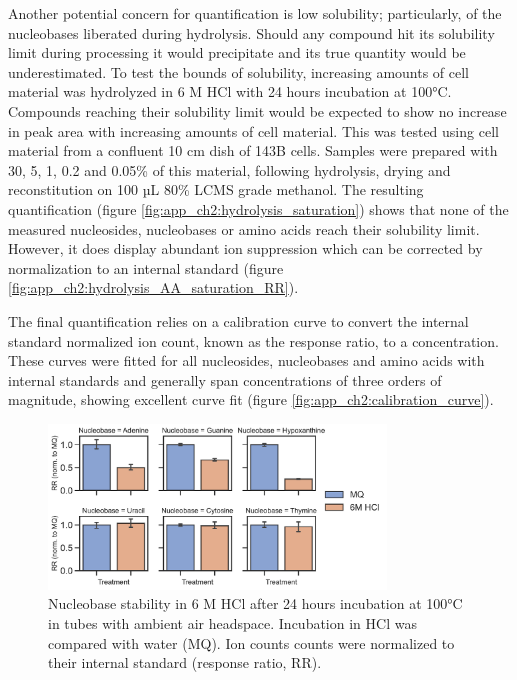 Another potential concern for quantification is low solubility; particularly, of the nucleobases liberated during hydrolysis.
Should any compound hit its solubility limit during processing it would precipitate and its true quantity would be underestimated.
To test the bounds of solubility, increasing amounts of cell material was hydrolyzed in 6 M HCl with 24 hours incubation at 100°C.
Compounds reaching their solubility limit would be expected to show no increase in peak area with increasing amounts of cell material.
This was tested using cell material from a confluent 10 cm dish of 143B cells.
Samples were prepared with 30, 5, 1, 0.2 and 0.05\% of this material, following hydrolysis, drying and reconstitution on 100 µL 80\% LCMS grade methanol.
The resulting quantification (figure \ref{fig:app_ch2:hydrolysis_saturation}) shows that none of the measured nucleosides, nucleobases or amino acids reach their solubility limit.
However, it does display abundant ion suppression which can be corrected by normalization to an internal standard (figure \ref{fig:app_ch2:hydrolysis_AA_saturation_RR}).

The final quantification relies on a calibration curve to convert the internal standard normalized ion count, known as the response ratio, to a concentration.
These curves were fitted for all nucleosides, nucleobases and amino acids with internal standards and generally span concentrations of three orders of magnitude, showing excellent curve fit (figure \ref{fig:app_ch2:calibration_curve}).

\begin{figure}[ht]
    \centering
    \includegraphics[width=0.8\textwidth]{figures/chap2/app/nucleobase_hydrolysis_stability.pdf}
    \caption[Nucleobase stability in HCl.]{
    Nucleobase stability in 6 M HCl after 24 hours incubation at 100°C in tubes with ambient air headspace.
    Incubation in HCl was compared with water (MQ).
    Ion counts counts were normalized to their internal standard (response ratio, RR).
    }
    \label{fig:app_ch2:nucleobase_hydrolysis_stability}
\end{figure}

